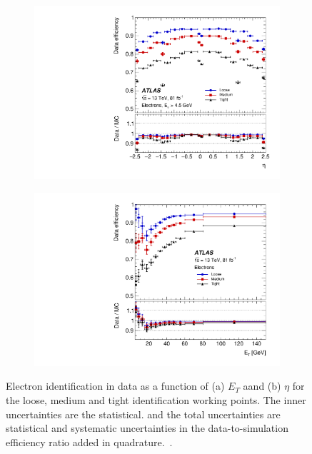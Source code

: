 \begin{figure}[]
    \centering
    \begin{subfigure}[b]{0.49\textwidth}
        \centering
        \includegraphics[width=\textwidth]{figures/reconstruction/figures_electronID_id_effeta.pdf}
        \caption{}
        \label{fig:method:reco:idetaeff}
    \end{subfigure}
    \begin{subfigure}[b]{0.49\textwidth}
        \centering
        \includegraphics[width=\textwidth]{figures/reconstruction/figures_electronID_id_effpt.pdf}
        \caption{}
        \label{fig:method:reco:idpteff}
    \end{subfigure}
    \caption[Electron identification efficiency as a function of $\eta$ and as a function of $E_T$ for the identification working points]{Electron identification in data as a function of (a) $E_T$ aand (b) $\eta$ for the loose, medium and tight identification working points. The inner uncertainties are the statistical. and the total uncertainties are statistical and systematic uncertainties in the data-to-simulation efficiency ratio added in quadrature.~\cite{Aad:2019tso}.}
    \label{fig:method:reco:ideff}
\end{figure}


